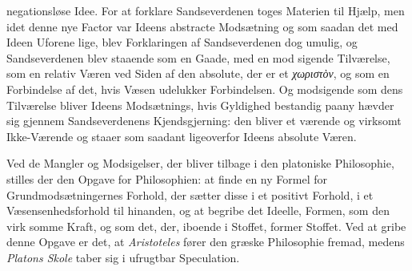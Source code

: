 \documentclass[12pt,a4paper]{book}
\newcommand{\gk}[1]{\textit{#1}}
\begin{document}
negationsløse Idee. For at forklare Sandseverdenen toges
Materien til Hjælp, men idet denne nye Factor var Ideens
abstracte Modsætning og som saadan det med Ideen Uforene\-%
lige, blev Forklaringen af Sandseverdenen dog umulig, og
Sandseverdenen blev staaende som en Gaade, med en mod\-%
sigende Tilværelse, som en relativ Væren ved Siden af den
absolute, der er et \gk{χωριστὸν}, og som en Forbindelse af det,
hvis Væsen udelukker Forbindelsen. Og modsigende som dens
Tilværelse bliver Ideens Modsætnings, hvis Gyldighed bestandig
paany hævder sig gjennem Sandseverdenens Kjendsgjerning:
den bliver et værende og virksomt Ikke-Værende og staaer
som saadant ligeoverfor Ideens absolute Væren.

Ved de Mangler og Modsigelser, der bliver tilbage i den
platoniske Philosophie, stilles der den Opgave for Philosophien:
at finde en ny Formel for Grundmodsætningernes Forhold, der
sætter disse i et positivt Forhold, i et Væsensenhedsforhold til
hinanden, og at begribe det Ideelle, Formen, som den virk\-%
somme Kraft, og som det, der, iboende i Stoffet, former
Stoffet. Ved at gribe denne Opgave er det, at \emph{Aristoteles}
fører den græske Philosophie fremad, medens \emph{Platons Skole}
taber sig i ufrugtbar Speculation.
\end{document}
